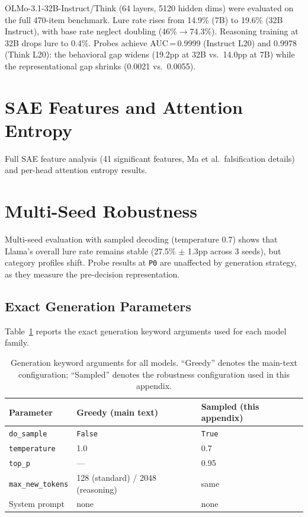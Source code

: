 \documentclass{article}
\newcommand{\pzero}{\texttt{P0}}
\begin{document}
OLMo-3.1-32B-Instruct/Think (64 layers, 5120 hidden dims) were evaluated
on the full 470-item benchmark.  Lure rate rises from 14.9\% (7B) to
19.6\% (32B Instruct), with base rate neglect doubling (46\%$\to$74.3\%).
Reasoning training at 32B drops lure to 0.4\%.  Probes achieve
AUC\,=\,0.9999 (Instruct L20) and 0.9978 (Think L20): the behavioral gap
widens (19.2pp at 32B vs.\ 14.0pp at 7B) while the representational gap
shrinks (0.0021 vs.\ 0.0055).

\section{SAE Features and Attention Entropy}
\label{app:sae_attention}
Full SAE feature analysis (41 significant features, Ma et al.\
falsification details) and per-head attention entropy results.

\section{Multi-Seed Robustness}
\label{app:robustness}
Multi-seed evaluation with sampled decoding (temperature 0.7) shows
that Llama's overall lure rate remains stable (27.5\% $\pm$ 1.3pp across
3 seeds), but category profiles shift.  Probe results at \pzero{} are
unaffected by generation strategy, as they measure the pre-decision
representation.

\subsection{Exact Generation Parameters}

Table~\ref{tab:gen_kwargs} reports the exact generation keyword arguments
used for each model family.

\begin{table}[ht]
\centering
\caption{Generation keyword arguments for all models.  ``Greedy'' denotes
  the main-text configuration; ``Sampled'' denotes the robustness
  configuration used in this appendix.}
\label{tab:gen_kwargs}
\vspace{4pt}
\small
\begin{tabular}{lll}
\toprule
\textbf{Parameter} & \textbf{Greedy (main text)} & \textbf{Sampled (this appendix)} \\
\midrule
\texttt{do\_sample}       & \texttt{False} & \texttt{True} \\
\texttt{temperature}      & 1.0            & 0.7 \\
\texttt{top\_p}           & ---            & 0.95 \\
\texttt{max\_new\_tokens} & 128 (standard) / 2048 (reasoning) & same \\
System prompt             & none           & none \\
\bottomrule
\end{tabular}
\end{table}
\end{document}
